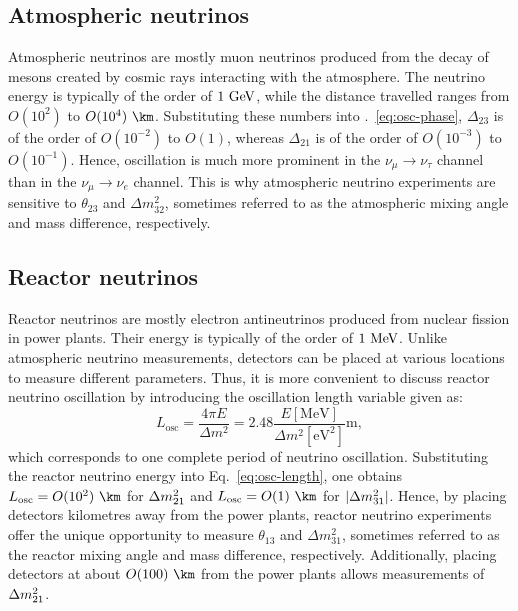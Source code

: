 \subsection{Atmospheric neutrinos}
Atmospheric neutrinos are mostly muon neutrinos produced from the decay of mesons created by cosmic rays interacting with the atmosphere.
The neutrino energy is typically of the order of $1~\textrm{GeV}$, while the distance travelled ranges from $O(10^2)$ to $O(10^4)~\km$.
Substituting these numbers into \Eq.~\ref{eq:osc-phase}, $\Delta_{23}$ is of the order of $O(10^{-2})$ to $O(1)$, whereas $\Delta_{21}$ is of the order of $O(10^{-3})$ to $O(10^{-1})$.
Hence, oscillation is much more prominent in the $\nu_\mu \to \nu_\tau$ channel than in the $\nu_\mu \to \nu_e$ channel.
This is why atmospheric neutrino experiments are sensitive to $\theta_{23}$ and $\Delta m^2_{32}$, sometimes referred to as the atmospheric mixing angle and mass difference, respectively.

\subsection{Reactor neutrinos}
Reactor neutrinos are mostly electron antineutrinos produced from nuclear fission in power plants.
Their energy is typically of the order of $1~\textrm{MeV}$.
Unlike atmospheric neutrino measurements, detectors can be placed at various locations to measure different parameters.
Thus, it is more convenient to discuss reactor neutrino oscillation by introducing the oscillation length variable given as:
\begin{equation}
  \label{eq:osc-length}
  L_{\text{osc}} = \frac{4\pi E}{\Delta m^2} = 2.48 \frac{E [\text{MeV}]}{\Delta m^2 [\text{eV}^2]} \text{m},
\end{equation}
which corresponds to one complete period of neutrino oscillation.
Substituting the reactor neutrino energy into Eq.~\ref{eq:osc-length}, one obtains $L_{\text{osc}} = O(10^2)~\km$ for $\Delta m^2_{21}$ and $L_{\text{osc}} = O(1)~\km$ for $|\Delta m^2_{31}|$. 
Hence, by placing detectors kilometres away from the power plants, reactor neutrino experiments offer the unique opportunity to measure $\theta_{13}$ and $\Delta m^2_{31}$, sometimes referred to as the reactor mixing angle and mass difference, respectively.
Additionally, placing detectors at about $O(100)~\km$ from the power plants allows measurements of $\Delta m^2_{21}$.

